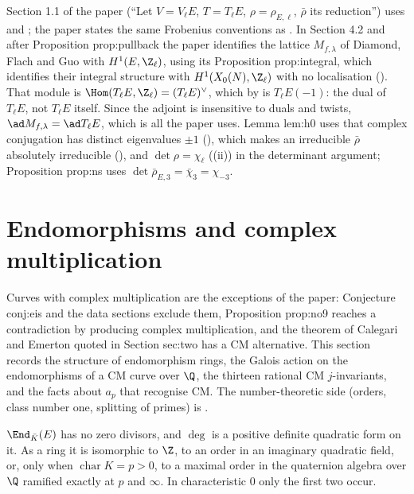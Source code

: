 \begin{paperlink}\label{pl:ellcurves:section11}
Section 1.1 of the paper (``Let $V=V_\ell E$, $T=T_\ell E$, $\rho=\rho_{E,\ell}$, $\bar\rho$ its reduction'') uses  and
; the paper states the same Frobenius conventions as . In Section 4.2 and after
Proposition prop:pullback the paper identifies the lattice $M_{f,\lambda}$ of Diamond, Flach and Guo with $H^1(E,\Z_\ell)$, using its Proposition prop:integral, which identifies their integral structure with $H^1(X_0(N),\Z_\ell)$ with no localisation (). That module is
$\Hom(T_\ell E,\Z_\ell)=(T_\ell E)^\vee$, which by  is $T_\ell E(-1)$: the dual of $T_\ell E$, not $T_\ell E$ itself. Since the adjoint is insensitive to
duals and twists, $\ad M_{f,\lambda}=\ad T_\ell E$, which is all the paper uses. Lemma lem:h0 uses that complex conjugation has distinct eigenvalues $\pm1$
(), which makes an irreducible $\bar\rho$ absolutely irreducible (), and $\det\rho=\chi_\ell$ ((ii)) in the
determinant argument; Proposition prop:ns uses $\det\bar\rho_{E,3}=\bar\chi_3=\chi_{-3}$.
\end{paperlink}

\section{Endomorphisms and complex multiplication}\label{sec:ellcurves:cm}

Curves with complex multiplication are the exceptions of the paper: Conjecture conj:eis and the data sections exclude them, Proposition prop:no9 reaches a
contradiction by producing complex multiplication, and the theorem of Calegari and Emerton quoted in Section sec:two has a CM alternative. This section
records the structure of endomorphism rings, the Galois action on the endomorphisms of a CM curve over $\Q$, the thirteen rational CM $j$-invariants, and the
facts about $a_p$ that recognise CM. The number-theoretic side (orders, class number one, splitting of primes) is .

\begin{theorem}\label{thm:ellcurves:end}
$\End_{\bar K}(E)$ has no zero divisors, and $\deg$ is a positive definite quadratic form on it. As a ring it is isomorphic to $\Z$, to an order in an
imaginary quadratic field, or, only when $\operatorname{char}K=p>0$, to a maximal order in the quaternion algebra over $\Q$ ramified exactly at $p$ and $\infty$. In
characteristic $0$ only the first two occur.
\end{theorem}

